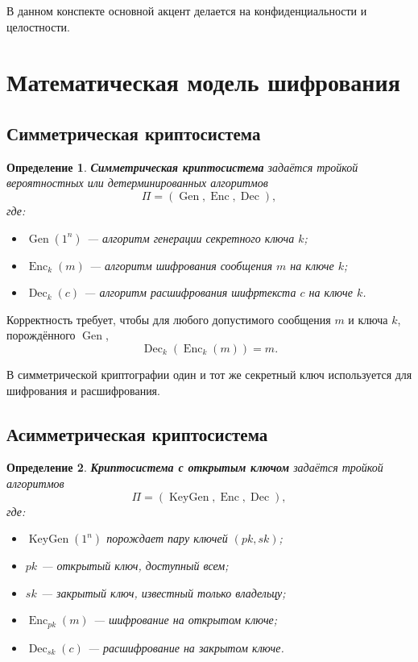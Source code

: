 \documentclass[12pt,a4paper]{article}
\newtheorem{definition}{Определение}
\DeclareMathOperator{\Enc}{Enc}
\DeclareMathOperator{\Dec}{Dec}
\DeclareMathOperator{\Gen}{Gen}
\DeclareMathOperator{\KeyGen}{KeyGen}
\begin{document}
В данном конспекте основной акцент делается на конфиденциальности и целостности.

\section{Математическая модель шифрования}

\subsection{Симметрическая криптосистема}

\begin{definition}
\textbf{Симметрическая криптосистема} задаётся тройкой вероятностных или детерминированных алгоритмов
\[
    \Pi = (\Gen, \Enc, \Dec),
\]
где:
\begin{itemize}
    \item $\Gen(1^n)$ --- алгоритм генерации секретного ключа $k$;
    \item $\Enc_k(m)$ --- алгоритм шифрования сообщения $m$ на ключе $k$;
    \item $\Dec_k(c)$ --- алгоритм расшифрования шифртекста $c$ на ключе $k$.
\end{itemize}
\end{definition}

Корректность требует, чтобы для любого допустимого сообщения $m$ и ключа $k$, порождённого $\Gen$,
\[
    \Dec_k(\Enc_k(m)) = m.
\]

В симметрической криптографии один и тот же секретный ключ используется для шифрования и расшифрования.

\subsection{Асимметрическая криптосистема}

\begin{definition}
\textbf{Криптосистема с открытым ключом} задаётся тройкой алгоритмов
\[
    \Pi = (\KeyGen, \Enc, \Dec),
\]
где:
\begin{itemize}
    \item $\KeyGen(1^n)$ порождает пару ключей $(pk,sk)$;
    \item $pk$ --- открытый ключ, доступный всем;
    \item $sk$ --- закрытый ключ, известный только владельцу;
    \item $\Enc_{pk}(m)$ --- шифрование на открытом ключе;
    \item $\Dec_{sk}(c)$ --- расшифрование на закрытом ключе.
\end{itemize}
\end{definition}
\end{document}
